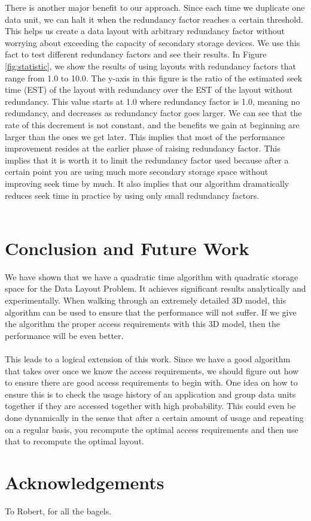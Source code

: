 \documentclass[conference]{acmsiggraph}
\begin{document}
There is another major benefit to our approach. Since each time we duplicate one data unit, we can halt it when the redundancy factor reaches a certain threshold. This helps us create a data layout with arbitrary redundancy factor without worrying about exceeding the capacity of secondary storage devices. We use this fact to test different redundancy factors and see their results. In Figure \ref{fig:statistic}, we show the results of using layouts with redundancy factors that range from 1.0 to 10.0. The y-axis in this figure is the ratio of the estimated seek time (EST) of the layout with redundancy over the EST of the layout without redundancy. This value starts at 1.0 where redundancy factor is 1.0, meaning no redundancy, and decreases as redundancy factor goes larger. We can see that the rate of this decrement is not constant, and the benefits we gain at beginning are larger than the ones we get later. This implies that most of the performance improvement resides at the earlier phase of raising redundancy factor. This implies that it is worth it to limit the redundancy factor used because after a certain point you are using much more secondary storage space without improving seek time by much. It also implies that our algorithm dramatically reduces seek time in practice by using only small redundancy factors. \\  
\\


\section{Conclusion and Future Work}

We have shown that we have a quadratic time algorithm with quadratic storage space for the Data Layout Problem. It achieves significant results analytically and experimentally. When walking through an extremely detailed 3D model, this algorithm can be used to ensure that the performance will not suffer. If we give the algorithm the proper access requirements with this 3D model, then the performance will be even better.\\
\\
This leads to a logical extension of this work. Since we have a good algorithm that takes over once we know the access requirements, we should figure out how to ensure there are good access requirements to begin with. One idea on how to ensure this is to check the usage history of an application and group data units together if they are accessed together with high probability. This could even be done dynamically in the sense that after a certain amount of usage and repeating on a regular basis, you recompute the optimal access requirements and then use that to recompute the optimal layout. 

\section{Acknowledgements}

To Robert, for all the bagels.



\end{document}
